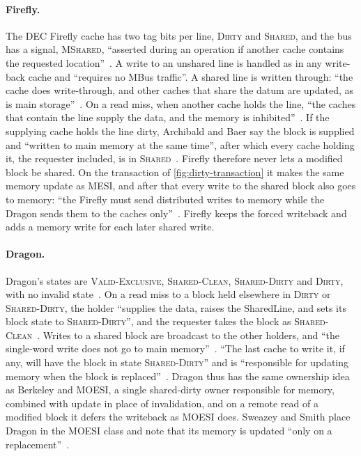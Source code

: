 \paragraph{Firefly.} The DEC Firefly cache has two tag bits per line,
\textsc{Dirty} and \textsc{Shared}, and the bus has a signal, \textsc{MShared},
``asserted during an operation if another cache contains the requested
location''~\cite[p.~7]{thacker1987firefly}. A write to an unshared line is handled
as in any write-back cache and ``requires no MBus traffic''. A shared line is
written through: ``the cache does write-through, and other caches that share the
datum are updated, as is main storage''~\cite[p.~7]{thacker1987firefly}. On a read
miss, when another cache holds the line, ``the caches that contain the line supply
the data, and the memory is inhibited''~\cite[p.~8]{thacker1987firefly}. If the
supplying cache holds the line dirty, Archibald and Baer say the block is supplied
and ``written to main memory at the same time'', after which every cache holding
it, the requester included, is in \textsc{Shared}~\cite[p.~280]{archibald1986evaluation}.
Firefly therefore never lets a modified block be shared. On the transaction of
\cref{fig:dirty-transaction} it makes the same memory update as MESI, and after
that every write to the shared block also goes to memory: ``the Firefly must send
distributed writes to memory while the Dragon sends them to the caches
only''~\cite[p.~295]{archibald1986evaluation}. Firefly keeps the forced writeback
and adds a memory write for each later shared write.

\paragraph{Dragon.} Dragon's states are \textsc{Valid-Exclusive},
\textsc{Shared-Clean}, \textsc{Shared-Dirty} and \textsc{Dirty}, with no invalid
state~\cite{archibald1986evaluation}. On a read miss to a block held elsewhere in
\textsc{Dirty} or \textsc{Shared-Dirty}, the holder ``supplies the data, raises the
SharedLine, and sets its block state to \textsc{Shared-Dirty}'', and the requester
takes the block as \textsc{Shared-Clean}~\cite[p.~281]{archibald1986evaluation}.
Writes to a shared block are broadcast to the other holders, and ``the single-word
write does not go to main memory''~\cite[p.~282]{archibald1986evaluation}. ``The
last cache to write it, if any, will have the block in state \textsc{Shared-Dirty}''
and is ``responsible for updating memory when the block is
replaced''~\cite[p.~281]{archibald1986evaluation}. Dragon thus has the same
ownership idea as Berkeley and MOESI, a single shared-dirty owner responsible for
memory, combined with update in place of invalidation, and on a remote read of a
modified block it defers the writeback as MOESI does. Sweazey and Smith place
Dragon in the MOESI class and note that its memory is updated ``only on a
replacement''~\cite[p.~420]{sweazey1986moesi}.

